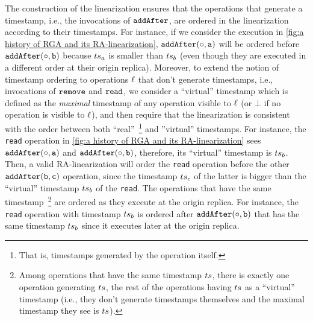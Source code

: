 The construction of the linearization ensures that the operations that generate a timestamp, i.e., the invocations of ${\tt addAfter}$, are ordered in the linearization according to their timestamps. For instance, if we consider the execution in \autoref{fig:a history of RGA and its RA-linearization}, $\alabelshort[{\tt addAfter}]{\circ,a}$ will be ordered before $\alabelshort[{\tt addAfter}]{\circ,b}$ because $ts_a$ is smaller than $ts_b$ (even though they are executed in a different order at their origin replica). 
%
Moreover, to extend the notion of timestamp ordering to operations $\ell$ that don't generate timestamps, i.e., invocations of ${\tt remove}$ and ${\tt read}$, we consider a ``virtual'' timestamp which is defined as the \emph{maximal} timestamp of any operation visible to $\ell$ (or $\bot$ if no operation is visible to $\ell$), and then require that the linearization is consistent with the order between both ``real''~\footnote{That is, timestamps generated by the operation itself.} and ''virtual'' timestamps. For instance, the {\tt read} operation in \autoref{fig:a history of RGA and its RA-linearization} sees $\alabelshort[{\tt addAfter}]{\circ,a}$ and $\alabelshort[{\tt addAfter}]{\circ,b}$, therefore, its ``virtual'' timestamp is $ts_b$. Then, a valid RA-linearization will order the {\tt read} operation before the other $\alabelshort[{\tt addAfter}]{b,c}$ operation, since the timestamp $ts_c$ of the latter is bigger than the ``virtual'' timestamp $ts_b$ of the {\tt read}. The operations that have the same timestamp~\footnote{Among operations that have the same timestamp $ts$, there is exactly one operation generating $ts$, the rest of the operations having $ts$ as a ``virtual'' timestamp (i.e., they don't generate timestamps themselves and the maximal timestamp they see is $ts$).} are ordered as they execute at the origin replica. For instance, the {\tt read} operation with timestamp $ts_b$ is ordered after $\alabelshort[{\tt addAfter}]{\circ,b}$ that has the same timestamp $ts_b$ since it executes later at the origin replica.


